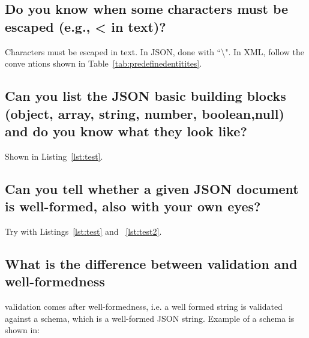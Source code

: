 \documentclass{article}
\begin{document}
\subsection{Do you know when some characters must be escaped (e.g., < in text)?}

Characters must be escaped in text. In JSON, done with ``\textbackslash". In XML, follow the conve
ntions shown in Table~\ref{tab:predefinedentitites}.

\subsection{Can you list the JSON basic building blocks (object, array, string, number, boolean,null) and do you know what they look like?}

Shown in Listing~\ref{lst:test}.

\subsection{Can you tell whether a given JSON document is well-formed, also with your own eyes?}

Try with Listings~\ref{lst:test} and ~\ref{lst:test2}.

\subsection{What is the difference between validation and well-formedness}

validation comes after well-formedness, i.e. a well formed string is validated against a schema, which is a well-formed JSON string. Example of a schema is shown in:
\end{document}
